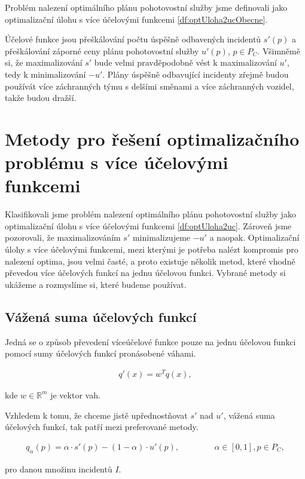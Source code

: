 Problém nalezení optimálního plánu pohotovostní služby jsme definovali jako optimalizační úlohu s více účelovými funkcemi \ref{df:optUloha2ucObecne}.

Účelové funkce jsou přeškálování počtu úspěšně odbavených incidentů $s'(p)$ a přeškálování záporné ceny plánu pohotovostní služby $u'(p)$, $p \in P_C$.
Všimněmě si, že maximalizování $s'$ bude velmi pravděpodobně vést k maximalizování $u'$, tedy k minimalizování $-u'$.
Plány úspěšně odbavující incidenty zřejmě budou používát více záchranných týmu s delšími směnami a více záchranných vozidel, takže budou dražší.

\section{Metody pro řešení optimalizačního problému s více účelovými funkcemi}\label{kap:metodyProReseniOptSViceUcel}

Klasifikovali jsme problém nalezení optimálního plánu pohotovostní služby jako optimalizační úlohu s více účelovými funkcemi \ref{df:optUloha2uc}.
Zároveň jsme pozorovali, že maximalizováním $s'$ minimalizujeme $-u'$ a naopak.
Optimalizační úlohy s více účelovými funkcemi, mezi kterými je potřeba nalézt kompromis pro nalezení optima, jsou velmi časté,
a proto existuje několik metod, které vhodně převedou více účelových funkcí na jednu účelovou funkci.
Vybrané metody si ukážeme a rozmyslíme si, které budeme používat.

\subsection{Vážená suma účelových funkcí}\label{kap:vazenaSumaUcelF}

Jedná se o způsob převedení víceúčelové funkce pouze na jednu účelovou funkci pomocí sumy účelových funkcí pronásobené váhami.

\begin{definice}
  \begin{align*}
    q'(x) = w^T q(x),
  \end{align*}

  kde $w \in \mathbb{R}^m$ je vektor vah.
\end{definice}

Vzhledem k tomu, že chceme jistě upřednostňovat $s'$ nad $u'$, vážená suma účelových funkcí, tak patří mezi preferované metody.

\begin{definice}\label{df:vazenaSumaPohotovost}
  \begin{align*}
    q_{\alpha}(p) = \alpha \cdot s'(p) - (1 - \alpha) \cdot u'(p), \hspace{50pt} \alpha \in [0, 1], p \in P_C,
  \end{align*}

  pro danou množinu incidentů $I$.
\end{definice}

